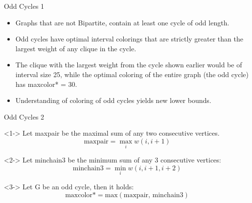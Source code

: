 \begin{frame}{Odd Cycles 1}
  \begin{itemize}
    \item<1-> Graphs that are not Bipartite, contain at least one cycle of odd length.
    \null
    \item<2-> Odd cycles have optimal interval colorings that are strictly greater than the largest weight of
    any clique in the cycle.
    \null
    \item<3-> The clique with the largest weight from the cycle shown earlier would be of interval size 25, while the
    optimal coloring of the entire graph (the odd cycle) has maxcolor* = 30.
    \null
    \item<4-> Understanding of coloring of odd cycles yields new lower bounds.
  \end{itemize}
\end{frame}

\begin{frame}{Odd Cycles 2}
  
  \begin{definition}<1->
    Let maxpair be the maximal sum of any two consecutive vertices. \footnotemark[1] \footnotemark[2]
    \[ \text{maxpair} = \max_i w(i, i + 1) \] 
  \end{definition}

  \begin{definition}<2->
    Let minchain3 be the minimum sum of any 3 consecutive vertices:
    \[ \text{minchain3} = \min_i w(i, i + 1, i+2) \]
  \end{definition}

  \begin{theorem}<3->
    Let G be an odd cycle, then it holds:
    \[ \text{maxcolor*} = \text{max}(\text{maxpair, minchain3}) \]
  \end{theorem}

\end{frame}

